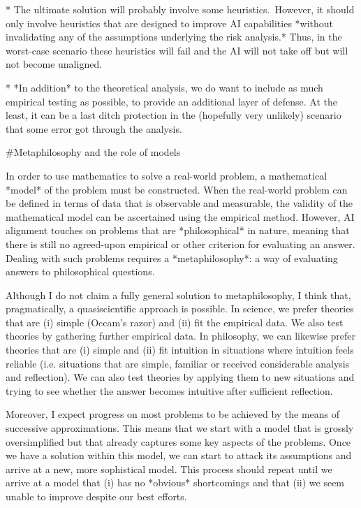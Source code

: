 \documentclass[a4paper]{article}
\begin{document}
* The ultimate solution will probably involve some heuristics.\ However, it should only involve heuristics that are designed to improve AI capabilities *without invalidating any of the assumptions underlying the risk analysis.* Thus, in the worst-case scenario these heuristics will fail and the AI will not take off but will not become unaligned.

* *In addition* to the theoretical analysis, we do want to include as much empirical testing as possible, to provide an additional layer of defense. At the least, it can be a last ditch protection in the (hopefully very unlikely) scenario that some error got through the analysis.

\#Metaphilosophy and the role of models

In order to use mathematics to solve a real-world problem, a mathematical *model* of the problem must be constructed. When the real-world problem can be defined in terms of data that is observable and measurable, the validity of the mathematical model can be ascertained using the empirical method. However, AI alignment touches on problems that are *philosophical* in nature, meaning that there is still no agreed-upon empirical or other criterion for evaluating an answer. Dealing with such problems requires a *metaphilosophy*: a way of evaluating answers to philosophical questions.

Although I do not claim a fully general solution to metaphilosophy, I think that, pragmatically, a quasiscientific approach is possible. In science, we prefer theories that are (i) simple (Occam's razor) and (ii) fit the empirical data. We also test theories by gathering further empirical data. In philosophy, we can likewise prefer theories that are (i) simple and (ii) fit intuition in situations where intuition feels reliable (i.e. situations that are simple, familiar or received considerable analysis and reflection). We can also test theories by applying them to new situations and trying to see whether the answer becomes intuitive after sufficient reflection.

Moreover, I expect progress on most problems to be achieved by the means of successive approximations. This means that we start with a model that is grossly oversimplified but that already captures some key aspects of the problems. Once we have a solution within this model, we can start to attack its assumptions and arrive at a new, more sophistical model. This process should repeat until we arrive at a model that (i) has no *obvious* shortcomings and that (ii) we seem unable to improve despite our best efforts. 
\end{document}
